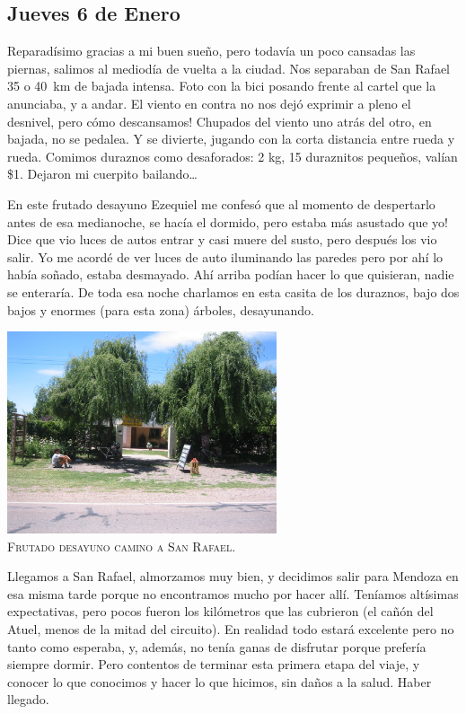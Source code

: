 \subsection*{Jueves 6 de Enero}

Reparad\'isimo gracias a mi buen sue\~no, pero todav\'ia un poco cansadas las
piernas, salimos al mediod\'ia de vuelta a la ciudad. Nos separaban de San
Rafael 35 o 40~km de bajada intensa. Foto con la bici posando frente al cartel
que la anunciaba, y a andar. El viento en contra no nos dej\'o exprimir a pleno
el desnivel, \textexclamdown pero c\'omo descansamos! Chupados del viento uno
atr\'as del otro, en bajada, no se pedalea. Y se divierte, jugando con la corta
distancia entre rueda y rueda. Comimos duraznos como desaforados: 2 kg, 15
duraznitos peque\~nos, val\'ian \$1. Dejaron mi cuerpito bailando\ldots

En este frutado desayuno Ezequiel me confes\'o que al momento de despertarlo
antes de esa medianoche, se hac\'ia el dormido, \textexclamdown pero estaba
m\'as asustado que yo! Dice que vio luces de autos entrar y casi muere del
susto, pero despu\'es los vio salir. Yo me acord\'e de ver luces de auto
iluminando las paredes pero por ah\'i lo hab\'ia so\~nado, estaba desmayado.
Ah\'i arriba pod\'ian hacer lo que quisieran, nadie se enterar\'ia. De toda esa
noche charlamos en esta casita de los duraznos, bajo dos bajos y enormes (para
esta zona) \'arboles, desayunando.

\begin{center} \includegraphics[width=300px]{images/Mendoza_0249.jpg}\\
\textsc{Frutado desayuno camino a San Rafael.} \end{center}

Llegamos a San Rafael, almorzamos muy bien, y decidimos salir para Mendoza en
esa misma tarde porque no encontramos mucho por hacer all\'i. Ten\'iamos
alt\'isimas expectativas, pero pocos fueron los kil\'ometros que las cubrieron
(el ca\~n\'on del Atuel, menos de la mitad del circuito). En realidad todo
estar\'a excelente pero no tanto como esperaba, y, adem\'as, no ten\'ia ganas de
disfrutar porque prefer\'ia siempre dormir. Pero contentos de terminar esta
primera etapa del viaje, y conocer lo que conocimos y hacer lo que hicimos, sin
da\~nos a la salud. Haber llegado.\\


